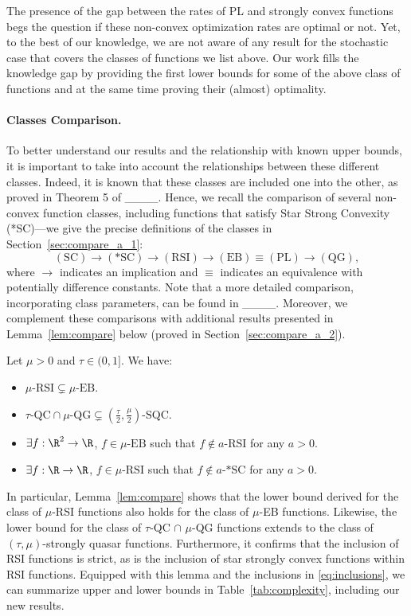 	The presence of the gap between the rates of PL and strongly convex functions begs the question if these non-convex optimization rates are optimal or not.
	Yet, to the best of our knowledge, we are not aware of any result for the stochastic case that covers the classes of functions we list above. Our work fills the knowledge gap by providing the first lower bounds for some of the above class of functions and at the same time proving their (almost) optimality.
	
	\paragraph{Classes Comparison.}
	To better understand our results and the relationship with known upper bounds, it is important to take into account the relationships between these different classes. Indeed, it is known that these classes are included one into the other, as proved in Theorem 5 of ____.
	Hence, we recall the comparison of several non-convex function classes,
	including functions that satisfy Star Strong Convexity (*SC)---we give the precise definitions of the classes in Section~\ref{sec:compare_a_1}:
	\begin{equation}\label{eq:inclusions}
		(\text{SC}) 
		\rightarrow 
		(\text{*SC}) 
		\rightarrow 
		(\text{RSI}) 
		\rightarrow 
		(\text{EB}) \equiv (\text{PL}) 
		\rightarrow 
		(\text{QG}),
	\end{equation}
	where $\rightarrow$ indicates an implication and $\equiv$ indicates an equivalence with potentially difference constants. Note that a more detailed comparison, incorporating class parameters, can be found in ____. Moreover, we complement these comparisons with additional results presented in Lemma~\ref{lem:compare} below (proved in Section~\ref{sec:compare_a_2}).
	\begin{lemma}\label{lem:compare}
		Let $\mu >0$ and $\tau \in (0,1]$. We have:
		\begin{itemize}
			\item $\mu\text{-RSI} \subsetneq \mu\text{-EB}$.
			\item $\tau\text{-QC} \cap \mu\text{-QG} \subsetneq (\frac{\tau}{2}, \frac{\mu}{2})\text{-SQC}$.
			\item $\exists f:\R^2\rightarrow\R$, $f\in\mu\text{-EB}$ such that $f\notin a\text{-RSI}$ for any $a>0$.
			\item $\exists f:\R\rightarrow\R$, $f\in \mu\text{-RSI}$ such that $f\notin a\text{-*SC}$ for any $a>0$.
		\end{itemize}
	\end{lemma}
	In particular, Lemma~\ref{lem:compare} shows that the lower bound derived for the class of $\mu$-RSI functions also holds for the class of $\mu$-EB functions. Likewise, the lower bound for the class of $\tau$-QC $\cap$ $\mu$-QG  functions extends to the class of $(\tau, \mu)$-strongly quasar functions. Furthermore, it confirms that the inclusion of RSI functions is strict, as is the inclusion of star strongly convex functions within RSI functions. Equipped with this lemma and the inclusions in \eqref{eq:inclusions}, we can summarize  upper and lower bounds in Table~\ref{tab:complexity}, including our new results.
	
